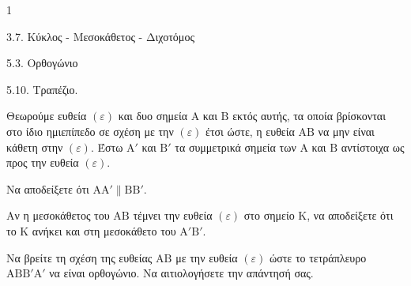 \begin{ylh}{1}
    \item 3.7. Κύκλος - Μεσοκάθετος - Διχοτόμος
    \item 5.3. Ορθογώνιο
    \item 5.10. Τραπέζιο.
\end{ylh}
Θεωρούμε ευθεία $(\varepsilon)$ και δυο σημεία $\mathrm{A}$ και $\mathrm{B}$ εκτός αυτής, τα οποία βρίσκονται στο ίδιο ημιεπίπεδο σε σχέση με την $(\varepsilon)$ έτσι ώστε, η ευθεία $\mathrm{A}\mathrm{B}$ να μην είναι κάθετη στην $(\varepsilon)$. Έστω $\mathrm{A}'$ και $\mathrm{B}'$ τα συμμετρικά σημεία των $\mathrm{A}$ και $\mathrm{B}$ αντίστοιχα ως προς την ευθεία $(\varepsilon)$.
\begin{alist}
    \item Να αποδείξετε ότι $\mathrm{A}\mathrm{A}' \parallel \mathrm{B}\mathrm{B}'$. 
    \item Αν η μεσοκάθετος του $\mathrm{A}\mathrm{B}$ τέμνει την ευθεία $(\varepsilon)$ στο σημείο $\mathrm{K}$, να αποδείξετε ότι το $\mathrm{K}$ ανήκει και στη μεσοκάθετο του $\mathrm{A}'\mathrm{B}'$. 
    \item Να βρείτε τη σχέση της ευθείας $\mathrm{A}\mathrm{B}$ με την ευθεία $(\varepsilon)$ ώστε το τετράπλευρο $\mathrm{A}\mathrm{B}\mathrm{B}'\mathrm{A}'$ να είναι ορθογώνιο. Να αιτιολογήσετε την απάντησή σας. 
\end{alist}
